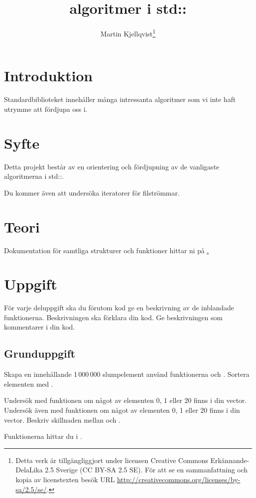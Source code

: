 \documentclass[a4paper]{miunasgn}
\title{algoritmer i std::}
\author{Martin Kjellqvist\footnote{%
  Detta verk är tillgängliggjort under licensen Creative Commons 
  Erkännande-DelaLika 2.5 Sverige (CC BY-SA 2.5 SE).
	För att se en sammanfattning och kopia av licenstexten besök URL 
	\url{http://creativecommons.org/licenses/by-sa/2.5/se/}.
}}
\date{\svnId}
\begin{document}
\maketitle
\thispagestyle{foot}
\tableofcontents


\section{Introduktion}
\noindent
Standardbiblioteket innehåller många intressanta algoritmer som vi inte haft
utrymme att fördjupa oss i.  


\section{Syfte}
\noindent
Detta projekt består av en orientering och fördjupning av de vanligaste algoritmerna i std::.

Du kommer även att undersöka iteratorer för filströmmar.

\section{Teori}
\label{sec:Theory}
\noindent
Dokumentation för samtliga strukturer och funktioner hittar ni på \href{www.cplusplus.com}.

\section{Uppgift}
\label{sec:Tasks}
\noindent


För varje deluppgift ska du förutom kod ge en beskrivning av 
de inblandade funktionerna. Beskrivningen ska förklara din kod. 
Ge beskrivningen som kommentarer i din kod.

\subsection{Grunduppgift}
\noindent
Skapa en  innehållande 1\,000\,000 slumpelement använd 
funktionerna  och .
Sortera elementen med .

Undersök med funktionen  om något av elementen 0, 1 eller 20 finns 
i din vector.
Undersök även med funktionen  om något av elementen 0, 
1 eller 20 finns i din vector.
Beskriv skillnaden mellan  och .

Funktionerna hittar du i .
\end{document}
